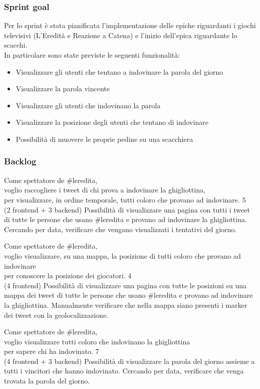 \subsubsection{Sprint goal}
Per lo sprint è stata pianificata l'implementazione delle epiche riguardanti i giochi televisivi (L'Eredità e Reazione a Catena) e
l'inizio dell'epica riguardante lo scacchi.\\
In particolare sono state previste le seguenti funzionalità:
\begin{itemize}
    \item Visualizzare gli utenti che tentano a indovinare la parola del giorno
    \item Visualizzare la parola vincente
    \item Visualizzare gli utenti che indovinano la parola
    \item Visualizzare la posizione degli utenti che tentano di indovinare
    \item Possibilità di muovere le proprie pedine su una scacchiera
\end{itemize}


\subsubsection{Backlog}
\userstory%
{Come spettatore de \#leredita,\\voglio raccogliere i tweet di chi prova a indovinare la ghigliottina,\\per visualizzare, in ordine temporale, tutti coloro che provano ad indovinare.}%
{5\\(2 frontend + 3 backend)}%
{Possibilità di visualizzare una pagina con tutti i tweet di tutte le persone che usano \#leredita e provano ad indovinare la ghigliottina.}%
{Cercando per data, verificare che vengano visualizzati i tentativi del giorno.}

\userstory%
{Come spettatore de \#leredita,\\voglio visualizzare, su una mappa, la posizione di tutti coloro che provano ad indovinare\\per conoscere la posizione dei giocatori.}%
{4\\(4 frontend)}%
{Possibilità di visualizzare una pagina con tutte le posizioni su una mappa dei tweet di tutte le persone che usano \#leredita e provano ad indovinare la ghigliottina.}%
{Manualmente verificare che nella mappa siano presenti i marker dei tweet con la geolocalizzazione.}

\userstory%
{Come spettatore de \#leredita,\\voglio visualizzare tutti coloro che indovinano la ghigliottina\\per sapere chi ha indovinato.}%
{7\\(4 frontend + 3 backend)}%
{Possibilità di visualizzare la parola del giorno assieme a tutti i vincitori che hanno indovinato.}%
{Cercando per data, verificare che venga trovata la parola del giorno.}

